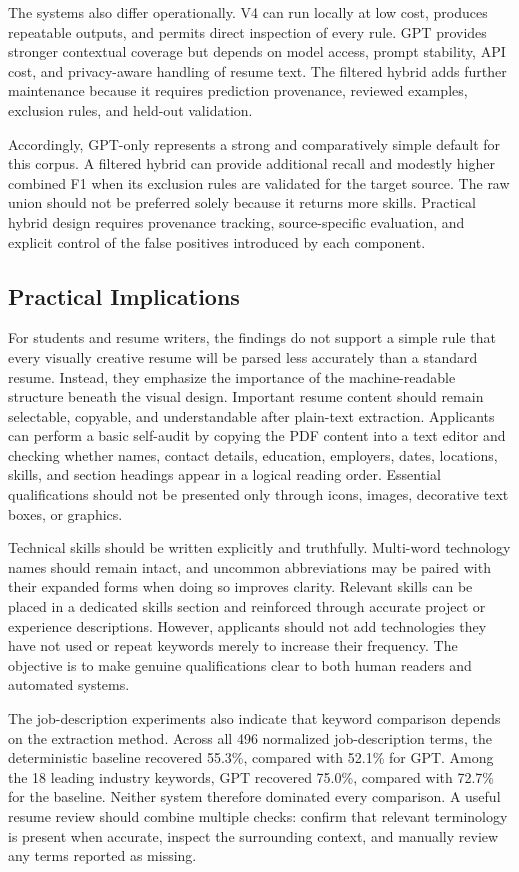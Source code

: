 \documentclass[conference]{IEEEtran}
\begin{document}
The systems also differ operationally. V4 can run locally at low cost,
produces repeatable outputs, and permits direct inspection of every rule.
GPT provides stronger contextual coverage but depends on model access,
prompt stability, API cost, and privacy-aware handling of resume text.
The filtered hybrid adds further maintenance because it requires
prediction provenance, reviewed examples, exclusion rules, and held-out
validation.

Accordingly, GPT-only represents a strong and comparatively simple
default for this corpus. A filtered hybrid can provide additional recall
and modestly higher combined F1 when its exclusion rules are validated
for the target source. The raw union should not be preferred solely
because it returns more skills. Practical hybrid design requires
provenance tracking, source-specific evaluation, and explicit control of
the false positives introduced by each component.

\subsection{Practical Implications}

For students and resume writers, the findings do not support a simple
rule that every visually creative resume will be parsed less accurately
than a standard resume. Instead, they emphasize the importance of the
machine-readable structure beneath the visual design. Important resume
content should remain selectable, copyable, and understandable after
plain-text extraction. Applicants can perform a basic self-audit by
copying the PDF content into a text editor and checking whether names,
contact details, education, employers, dates, locations, skills, and
section headings appear in a logical reading order. Essential
qualifications should not be presented only through icons, images,
decorative text boxes, or graphics.

Technical skills should be written explicitly and truthfully. Multi-word
technology names should remain intact, and uncommon abbreviations may be
paired with their expanded forms when doing so improves clarity. Relevant
skills can be placed in a dedicated skills section and reinforced through
accurate project or experience descriptions. However, applicants should
not add technologies they have not used or repeat keywords merely to
increase their frequency. The objective is to make genuine qualifications
clear to both human readers and automated systems.

The job-description experiments also indicate that keyword comparison
depends on the extraction method. Across all 496 normalized job-description
terms, the deterministic baseline recovered 55.3\%, compared with 52.1\%
for GPT. Among the 18 leading industry keywords, GPT recovered 75.0\%,
compared with 72.7\% for the baseline. Neither system therefore dominated
every comparison. A useful resume review should combine multiple checks:
confirm that relevant terminology is present when accurate, inspect the
surrounding context, and manually review any terms reported as missing.
\end{document}
